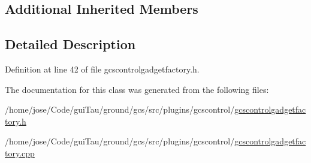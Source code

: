 \subsection*{Additional Inherited Members}


\subsection{Detailed Description}


Definition at line 42 of file gcscontrolgadgetfactory.\-h.



The documentation for this class was generated from the following files\-:\begin{DoxyCompactItemize}
\item 
/home/jose/\-Code/gui\-Tau/ground/gcs/src/plugins/gcscontrol/\hyperlink{gcscontrolgadgetfactory_8h}{gcscontrolgadgetfactory.\-h}\item 
/home/jose/\-Code/gui\-Tau/ground/gcs/src/plugins/gcscontrol/\hyperlink{gcscontrolgadgetfactory_8cpp}{gcscontrolgadgetfactory.\-cpp}\end{DoxyCompactItemize}
